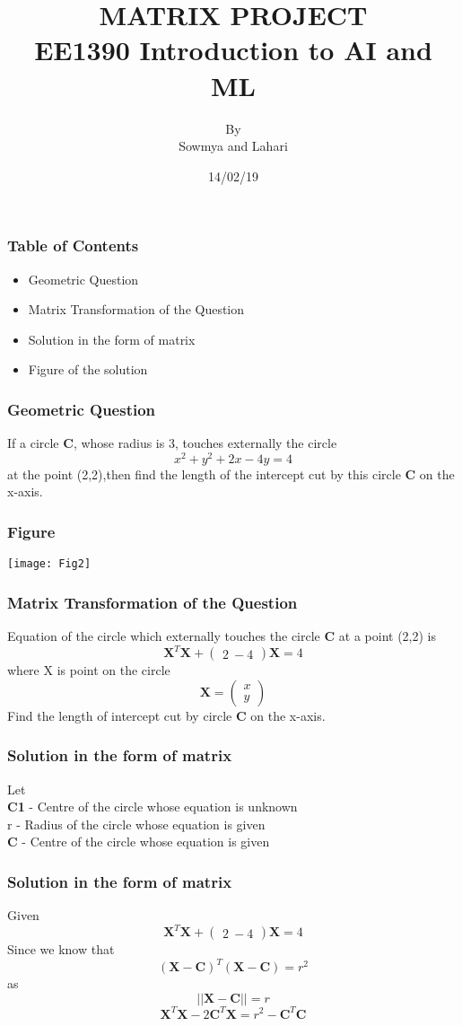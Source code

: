\documentclass{beamer}
\title{MATRIX PROJECT\\EE1390 Introduction to AI and ML}
\author{By\\Sowmya and Lahari}
\institute{Indian Institute of Technology Hyderabad}
\date{14/02/19}
\begin{document}
 
\frame{\titlepage}
 
\begin{frame}
\frametitle{Table of Contents}
\begin{itemize}
\item Geometric Question
\item Matrix Transformation of the Question
\item Solution in the form of matrix
\item Figure of the solution
\end{itemize}
\end{frame}
 
\begin{frame}
\frametitle{Geometric Question}
If a circle \textbf{C}, whose radius is 3,  touches externally the circle $$x^2+y^2+2x-4y = 4$$ at the point (2,2),then find the length of the intercept cut by this circle \textbf{C} on the x-axis.
\end{frame}

\begin{frame}
\frametitle{Figure}
\texttt{[image: Fig2]}
\end{frame}

\begin{frame}
\frametitle{Matrix Transformation of the Question}
Equation of the circle which externally touches the circle \textbf{C} at a point (2,2) is  $$\textbf{X}^T\textbf{X}+\begin{pmatrix} 2  \ -4\end{pmatrix}\textbf{X} = 4$$ where 
X is point on the circle $$ \textbf{X} = \begin{pmatrix} x \\ y \end{pmatrix}$$
Find the length of intercept cut by circle \textbf{C} on the x-axis.
\end{frame}

\begin{frame}
\frametitle{Solution in the form of matrix}
Let\\
\textbf{C1} - Centre of the circle whose equation is unknown\\
r - Radius of the circle whose equation is given\\
\textbf{C} - Centre of the circle whose equation is given\\
\end{frame}

\begin{frame}
\frametitle{Solution in the form of matrix}
Given\\
\begin{equation}
\textbf{X}^T\textbf{X}+\begin{pmatrix} 2  \ -4\end{pmatrix}\textbf{X} = 4
\end{equation}
Since we know that $$(\textbf{X}-\textbf{C})^T(\textbf{X}-\textbf{C}) = r^2$$ as
$$ ||\textbf{X}-\textbf{C}|| = r$$
\begin{equation}
\textbf{X}^T\textbf{X}-2\textbf{C}^T\textbf{X} = r^2 - \textbf{C}^T\textbf{C}
\end{equation}
\end{frame}
\end{document}
